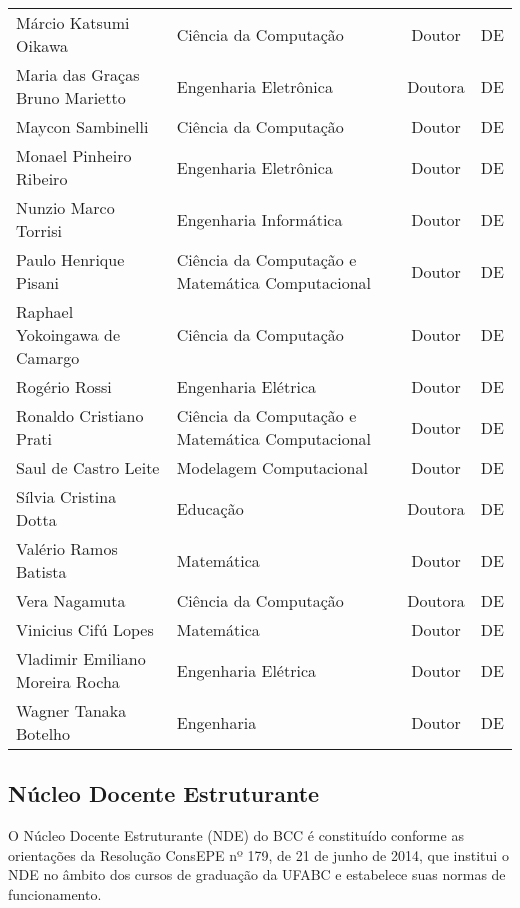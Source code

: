 \begin{longtable}{|l|l|c|c|}
    Márcio Katsumi Oikawa & Ciência da Computação & Doutor & DE \\
    Maria das Graças Bruno Marietto & Engenharia Eletrônica & Doutora & DE \\
    Maycon Sambinelli & Ciência da Computação & Doutor & DE \\
    Monael Pinheiro Ribeiro & Engenharia Eletrônica & Doutor & DE \\
    Nunzio Marco Torrisi & Engenharia Informática & Doutor & DE \\
    Paulo Henrique Pisani & Ciência da Computação e Matemática Computacional & Doutor & DE \\
    Raphael Yokoingawa de Camargo & Ciência da Computação & Doutor & DE \\
    Rogério Rossi & Engenharia Elétrica & Doutor & DE \\
    Ronaldo Cristiano Prati & Ciência da Computação e Matemática Computacional & Doutor & DE \\
    Saul de Castro Leite & Modelagem Computacional & Doutor & DE \\
    Sílvia Cristina Dotta & Educação & Doutora & DE \\
    Valério Ramos Batista & Matemática & Doutor & DE \\
    Vera Nagamuta & Ciência da Computação & Doutora & DE \\
    Vinicius Cifú Lopes & Matemática & Doutor & DE \\
    Vladimir Emiliano Moreira Rocha & Engenharia Elétrica & Doutor & DE \\
    Wagner Tanaka Botelho & Engenharia & Doutor & DE \\
    \hline
    
\end{longtable}


\subsection{Núcleo Docente Estruturante}

O Núcleo Docente Estruturante (NDE) do BCC é constituído conforme as
orientações da Resolução ConsEPE nº 179, de 21 de junho de 2014, que institui o
NDE no âmbito dos cursos de graduação da UFABC e estabelece suas normas de
funcionamento. 

